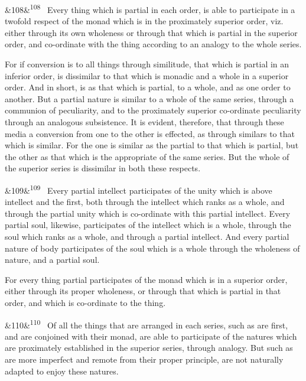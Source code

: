 \documentclass[12pt]{article}
\newcommand{\para}[1][]{\par\noindent\ifx&#1&\else\textsuperscript{\footnotesize #1}~\fi}
\begin{document}
\para[108] Every thing which is partial in each order, is able to participate in a twofold respect of the monad which is in the proximately superior order, viz. either through its own wholeness or through that which is partial in the superior order, and co-ordinate with the thing according to an analogy to the whole series.

For if conversion is to all things through similitude, that which is partial in an inferior order, is dissimilar to that which is monadic and a whole in a superior order. And in short, is as that which is partial, to a whole, and as one order to another. But a partial nature is similar to a whole of the same series, through a communion of peculiarity, and to the proximately superior co-ordinate peculiarity through an analogous subsistence. It is evident, therefore, that through these media a conversion from one to the other is effected, as through similars to that which is similar. For the one is similar as the partial to that which is partial, but the other as that which is the appropriate of the same series. But the whole of the superior series is dissimilar in both these respects.

\para[109] Every partial intellect participates of the unity which is above intellect and the first, both through the intellect which ranks as a whole, and through the partial unity which is co-ordinate with this partial intellect. Every partial soul, likewise, participates of the intellect which is a whole, through the soul which ranks as a whole, and through a partial intellect. And every partial nature of body participates of the soul which is a whole through the wholeness of nature, and a partial soul.

For every thing partial participates of the monad which is in a superior order, either through its proper wholeness, or through that which is partial in that order, and which is co-ordinate to the thing.

\para[110] Of all the things that are arranged in each series, such as are first, and are conjoined with their monad, are able to participate of the natures which are proximately established in the superior series, through analogy. But such as are more imperfect and remote from their proper principle, are not naturally adapted to enjoy these natures.
\end{document}
